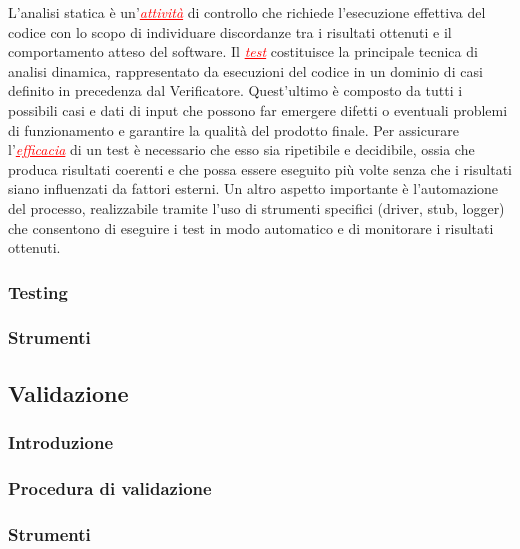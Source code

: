 L'analisi statica è un'\textcolor{red}{\uline{\textit{attività}}} di controllo che richiede l'esecuzione effettiva del codice con lo scopo di
individuare discordanze tra i risultati ottenuti e il comportamento atteso del software. Il \textcolor{red}{\uline{\textit{test}}} costituisce
la principale tecnica di analisi dinamica, rappresentato da esecuzioni del codice in un dominio di casi definito in precedenza dal Verificatore.
Quest'ultimo è composto da tutti i possibili casi e dati di input che possono far emergere difetti o eventuali problemi di funzionamento e
garantire la qualità del prodotto finale. Per assicurare l'\textcolor{red}{\uline{\textit{efficacia}}} di un test è necessario
che esso sia ripetibile e decidibile, ossia che produca risultati coerenti e che possa essere eseguito più volte senza che 
i risultati siano influenzati da fattori esterni. Un altro aspetto importante è l'automazione del processo, realizzabile tramite l'uso di
strumenti specifici (driver, stub, logger) che consentono di eseguire i test in modo automatico e di monitorare i risultati ottenuti.

\subsubsection{Testing}


\subsubsection{Strumenti}
\subsection{Validazione}
\subsubsection{Introduzione}
\subsubsection{Procedura di validazione}
\subsubsection{Strumenti}
